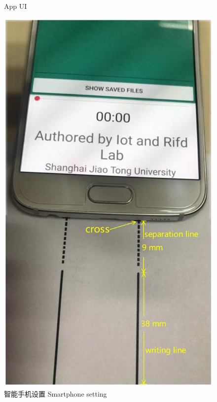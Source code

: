 \begin{figure}
\begin{minipage}[t]{0.32\textwidth}
      {App UI}
        \label{fig:app-ui}
  \end{minipage}
  \centering
  \begin{minipage}[t]{0.32\textwidth}
    \centering
    \includegraphics[width=\textwidth]{figure/app-smartphone-setting.pdf}
    \bicaption
    {智能手机设置}
    {Smartphone setting}
    \label{fig:smartphone-setting}
   \end{minipage}
   \begin{minipage}[t]{0.32\textwidth}

\end{minipage}
\end{figure}
